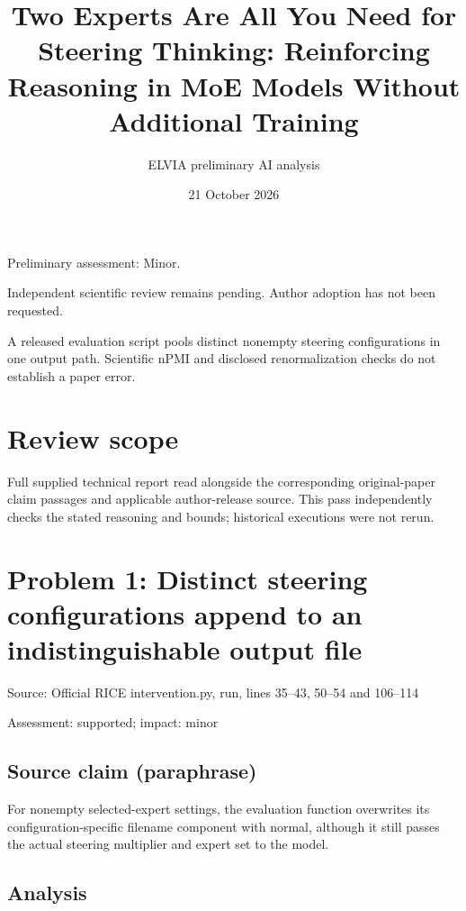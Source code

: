 \documentclass[11pt]{article}
\begin{document}
\title{Two Experts Are All You Need for Steering Thinking: Reinforcing Reasoning in MoE Models Without Additional Training}

\author{ELVIA preliminary AI analysis}\date{21 October 2026}\maketitle

Preliminary assessment: Minor.\par

Independent scientific review remains pending. Author adoption has not been requested.

A released evaluation script pools distinct nonempty steering configurations in one output path. Scientific nPMI and disclosed renormalization checks do not establish a paper error.

\section*{Review scope}

Full supplied technical report read alongside the corresponding original-paper claim passages and applicable author-release source. This pass independently checks the stated reasoning and bounds; historical executions were not rerun.

\section*{Problem 1: Distinct steering configurations append to an indistinguishable output file}

Source: Official RICE intervention.py, run, lines 35–43, 50–54 and 106–114

Assessment: supported; impact: minor

\subsection*{Source claim (paraphrase)}

For nonempty selected-expert settings, the evaluation function overwrites its configuration-specific filename component with normal, although it still passes the actual steering multiplier and expert set to the model.

\subsection*{Analysis}
\end{document}
